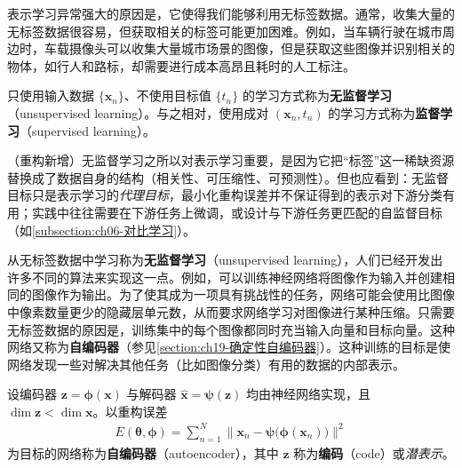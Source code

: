 \documentclass[../../main.tex]{subfiles}
\begin{document}
表示学习异常强大的原因是，它使得我们能够利用无标签数据。通常，收集大量的无标签数据很容易，但获取相关的标签可能更加困难。例如，当车辆行驶在城市周边时，车载摄像头可以收集大量城市场景的图像，但是获取这些图像并识别相关的物体，如行人和路标，却需要进行成本高昂且耗时的人工标注。

\begin{definition}[无监督学习]\label{definition:ch06-无监督学习}
只使用输入数据 $\{\boldsymbol{x}_n\}$、不使用目标值 $\{t_n\}$ 的学习方式称为\textbf{无监督学习}（unsupervised learning）。与之相对，使用成对 $(\boldsymbol{x}_n,t_n)$ 的学习方式称为\textbf{监督学习}（supervised learning）。
\end{definition}

\begin{remark}（重构新增）无监督学习之所以对表示学习重要，是因为它把“标签”这一稀缺资源替换成了数据自身的结构（相关性、可压缩性、可预测性）。但也应看到：无监督目标只是表示学习的\emph{代理目标}，最小化重构误差并不保证得到的表示对下游分类有用；实践中往往需要在下游任务上微调，或设计与下游任务更匹配的自监督目标（如\cref{subsection:ch06-对比学习}）。
\end{remark}

从无标签数据中学习称为\textbf{无监督学习}（unsupervised learning），人们已经开发出许多不同的算法来实现这一点。例如，可以训练神经网络将图像作为输入并创建相同的图像作为输出。为了使其成为一项具有挑战性的任务，网络可能会使用比图像中像素数量更少的隐藏层单元数，从而要求网络学习对图像进行某种压缩。只需要无标签数据的原因是，训练集中的每个图像都同时充当输入向量和目标向量。这种网络又称为\textbf{自编码器}（参见\cref{section:ch19-确定性自编码器}）。这种训练的目标是使网络发现一些对解决其他任务（比如图像分类）有用的数据的内部表示。

\begin{definition}[自编码器]\label{definition:ch06-自编码器}
设编码器 $\boldsymbol{z}=\boldsymbol{\phi}(\boldsymbol{x})$ 与解码器 $\hat{\boldsymbol{x}}=\boldsymbol{\psi}(\boldsymbol{z})$ 均由神经网络实现，且 $\dim\boldsymbol{z}<\dim\boldsymbol{x}$。以重构误差
\begin{align}
E(\boldsymbol{\theta},\boldsymbol{\phi})=\sum_{n=1}^{N}\bigl\|\boldsymbol{x}_n-\boldsymbol{\psi}\bigl(\boldsymbol{\phi}(\boldsymbol{x}_n)\bigr)\bigr\|^{2}
\label{align:ch06-自编码器}
\end{align}
为目标的网络称为\textbf{自编码器}（autoencoder），其中 $\boldsymbol{z}$ 称为\textbf{编码}（code）或\emph{潜表示}。
\end{definition}
\end{document}
